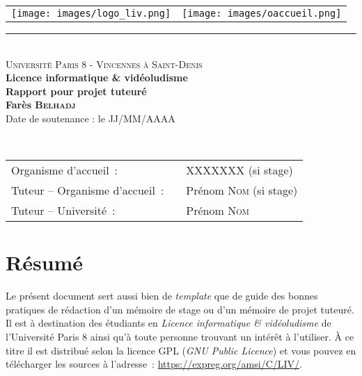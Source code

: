 \documentclass[a4paper, 12pt]{book}
\begin{document}
\begin{titlepage}
  \begin{center}
    \begin{tabular*}{\textwidth}{l@{\extracolsep{\fill}}r}
      \texttt{[image: images/logo\_liv.png]}&
      \texttt{[image: images/oaccueil.png]}
    \end{tabular*}
    \small 
    \rule{\textwidth}{.5pt}~\\
    \large 
    \textsc{Université Paris 8 - Vincennes à Saint-Denis}\vspace{0.5cm}\\
    \textbf{Licence informatique \& vidéoludisme}\vspace{3.0cm}\\
    \Large
    \textbf{Rapport pour projet tuteuré}\vspace{1.5cm}\\
    \large
    \textbf{Farès \textsc{Belhadj}}\vspace{1.5cm}\\
    Date de soutenance : le JJ/MM/AAAA\vspace{1.75cm}\\
  \end{center}\vspace{1.5cm}~\\
  \begin{tabular}{ll}
    \hspace{-0.45cm}Organisme d'accueil~:~&~XXXXXXX (si stage)\\
    \hspace{-0.45cm}Tuteur -- Organisme d'accueil~:~&~Prénom \textsc{Nom} (si stage)\\
    \hspace{-0.45cm}Tuteur -- Université~:~&~Prénom \textsc{Nom}\\
  \end{tabular}
\end{titlepage}
\frontmatter
\chapter*{Résumé}

Le présent document sert aussi bien de \emph{template} que de guide
des bonnes pratiques de rédaction d'un mémoire de stage ou d'un
mémoire de projet tuteuré. Il est à destination des étudiants en
\emph{Licence informatique \& vidéoludisme} de l'Université
Paris 8 ainsi qu'à toute personne trouvant un intérêt à
l'utiliser. \`A ce titre il est distribué selon la licence GPL
(\emph{GNU Public Licence}) et vous pouvez en télécharger les sources
à l'adresse~: \url{https://expreg.org/amsi/C/LIV/}.\\
\end{document}
